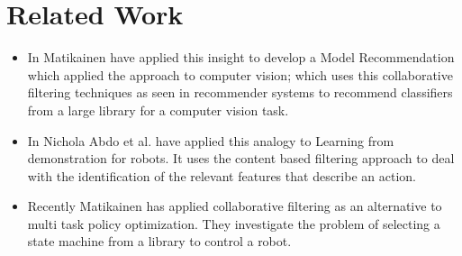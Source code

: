\documentclass[a4paper, 10pt]{report}   %
\begin{document}
\begin{itemize}
\end{itemize}


\section*{Related Work}
\begin{itemize}

\item In \cite{matikainen_model_2012}Matikainen  have applied this insight to develop a 
Model Recommendation which applied the approach to computer vision; which uses this 
collaborative filtering techniques as seen in recommender systems to recommend classifiers from 
a large library for a computer vision task.
\item In \cite{abdo_inferring_2014} Nichola Abdo et al. have applied this analogy to Learning from demonstration 
for robots.  It uses the content based filtering approach to deal with the identification 
of the relevant features that describe an action.
\item Recently \cite{matikainen_multi-armed_2013} Matikainen has applied  collaborative filtering as an alternative to 
multi task policy optimization. They investigate the problem of selecting a state 
machine from a library to control a robot.
\end{itemize}
\end{document}
